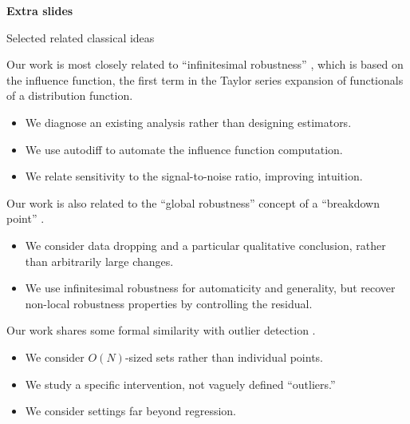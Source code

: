 
\begin{frame}{}
\begin{center}
    {\Huge \textbf{Extra slides}}
\end{center}
\end{frame}





\begin{frame}{Selected related classical ideas}

Our work is most closely related to ``infinitesimal robustness''
\citep{hampel1974influence, hampel1986robustbook}, which is based on the
influence function, the first term in the Taylor series expansion
of functionals of a distribution function.
%
\begin{itemize}
    \item We diagnose an existing analysis rather than designing
    estimators.
    \item We use autodiff to automate the influence function computation.
    \item We relate sensitivity to the signal-to-noise ratio, improving intuition.
\end{itemize}

\vspace{1em} Our work is also related to the ``global robustness'' concept of a
``breakdown point'' \citep{huber1981robust, huber:1983:notion}.
%
\begin{itemize}
    \item We consider data dropping and a particular qualitative conclusion,
    rather than arbitrarily large changes.
    \item We use infinitesimal robustness for automaticity and generality,
    but recover non-local robustness properties by controlling the residual.
\end{itemize}

\vspace{1em} Our work shares some formal similarity with outlier detection
\citep{cook1977detection, belsley2005regression}.
%
\begin{itemize}
    \item We consider $O(N)$-sized sets rather than individual points.
    \item We study a specific intervention, not vaguely defined
    ``outliers.''
    \item We consider settings far beyond regression.
\end{itemize}



\end{frame}


